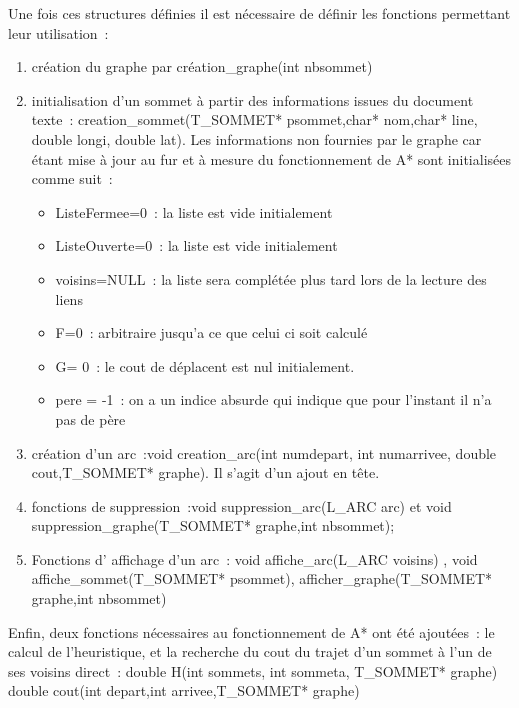 \documentclass[12pt,a4paper]{article}
\begin{document}
Une fois ces structures définies il est nécessaire de définir les fonctions permettant leur utilisation :
\begin{enumerate}
        \item création du graphe par  création\_graphe(int nbsommet)  
        \item initialisation d’un sommet à partir des informations issues du document texte :   creation\_sommet(T\_SOMMET* psommet,char* nom,char* line, double longi,   double lat). Les informations non fournies par le graphe car étant mise à jour au fur et à   mesure du fonctionnement de A* sont initialisées comme suit :
\begin{itemize}
\item ListeFermee=0 : la liste est vide initialement
\item ListeOuverte=0 : la liste est vide initialement
\item voisins=NULL : la liste sera complétée plus tard lors de la lecture des liens 
\item F=0 : arbitraire jusqu'a ce que celui ci soit calculé
\item G= 0 : le cout de déplacent est nul initialement.
\item pere = -1 : on a un indice absurde qui indique que pour l’instant il n’a pas de père  
\end{itemize}
 \item création d’un arc :void creation\_arc(int numdepart, int numarrivee, double cout,T\_SOMMET* graphe). Il s’agit d’un ajout en tête.
 \item fonctions de suppression :void suppression\_arc(L\_ARC arc) et void suppression\_graphe(T\_SOMMET* graphe,int nbsommet);
 \item Fonctions d’ affichage d’un arc : void affiche\_arc(L\_ARC voisins) , void affiche\_sommet(T\_SOMMET* psommet), afficher\_graphe(T\_SOMMET* graphe,int nbsommet)
\end{enumerate}
Enfin, deux fonctions nécessaires au fonctionnement de A* ont été ajoutées : le calcul de l’heuristique, et la recherche du cout du trajet d’un sommet à l’un de ses voisins direct :
double H(int sommets, int sommeta, T\_SOMMET* graphe)
double cout(int depart,int arrivee,T\_SOMMET* graphe)
\end{document}
